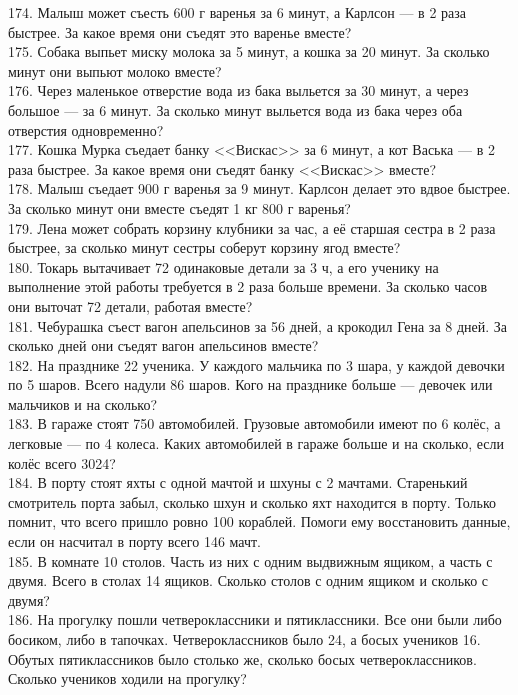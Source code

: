 \documentclass[12pt]{article}
\begin{document}
174. Малыш может съесть 600 г варенья за 6 минут, а Карлсон --- в 2 раза быстрее. За какое время они съедят это варенье вместе?\\
175. Собака выпьет миску молока за 5 минут, а кошка за 20 минут. За сколько минут они выпьют молоко вместе?\\
176. Через маленькое отверстие вода из бака выльется за 30 минут, а через большое --- за 6 минут. За сколько минут выльется вода из бака через оба отверстия одновременно?\\
177. Кошка Мурка съедает банку <<Вискас>> за 6 минут, а кот Васька --- в 2 раза быстрее. За какое время они съедят банку <<Вискас>> вместе?\\
178. Малыш съедает 900 г варенья за 9 минут. Карлсон делает это вдвое быстрее. За сколько минут они вместе съедят  1 кг 800 г варенья?\\
179. Лена  может собрать корзину клубники за час, а её старшая сестра в 2 раза быстрее, за сколько минут сестры соберут корзину ягод вместе?\\
180. Токарь вытачивает 72 одинаковые детали за 3 ч, а его ученику на выполнение этой работы требуется в 2 раза больше времени. За сколько часов они выточат 72 детали, работая вместе?\\
181. Чебурашка съест вагон апельсинов за 56 дней, а крокодил Гена за 8 дней. За сколько дней они съедят вагон апельсинов вместе?\\
182. На празднике 22 ученика. У каждого мальчика по 3 шара, у каждой девочки по 5 шаров. Всего надули 86 шаров. Кого на празднике больше --- девочек или мальчиков и на сколько?\\
183. В гараже стоят 750 автомобилей. Грузовые автомобили имеют по 6 колёс, а легковые --- по 4 колеса. Каких автомобилей в гараже больше и на сколько, если колёс всего 3024?\\
184. В порту стоят яхты с одной мачтой и шхуны с 2 мачтами. Старенький смотритель порта забыл, сколько шхун и сколько яхт находится в порту. Только помнит, что всего пришло ровно 100 кораблей. Помоги ему восстановить данные, если он насчитал в порту всего 146 мачт.\\
185. В комнате 10 столов. Часть из них с одним выдвижным ящиком, а часть с двумя. Всего в столах 14 ящиков. Сколько столов с одним ящиком и сколько с двумя?\\
186. На прогулку пошли четвероклассники и пятиклассники. Все они были либо босиком, либо в тапочках. Четвероклассников было 24, а босых учеников 16. Обутых пятиклассников было столько же, сколько босых четвероклассников. Сколько учеников  ходили на прогулку?\\
\end{document}

